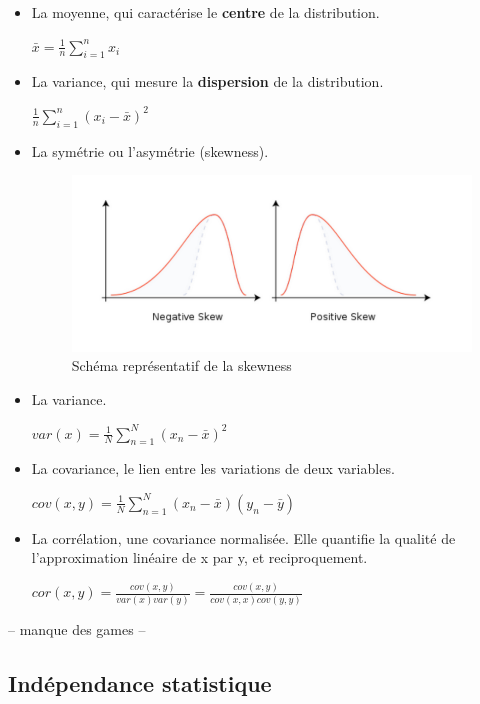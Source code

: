 \documentclass{article}
\begin{document}
\begin{itemize}
\item La moyenne, qui caractérise le \textbf{centre} de la distribution.

$ \bar{x} = \frac{1}{n} \sum_{i=1}^{n} x_i $

\item La variance, qui mesure la \textbf{dispersion} de la distribution.

$ \frac{1}{n} \sum_{i=1}^{n} (x_i - \bar{x})^{2} $

\item La symétrie ou l'asymétrie (skewness).

\begin{figure}[H]
   \caption{Schéma représentatif de la skewness}
    \begin{center} \includegraphics[scale=0.4]{skewness.png} \end{center}
\end{figure}

\item La variance.

$ var(x) = \frac{1}{N} \sum_{n=1}^{N} (x_n - \bar{x})^2 $

\item La covariance, le lien entre les variations de deux variables.

$ cov(x, y) = \frac{1}{N} \sum_{n=1}^{N} (x_n - \bar{x}) (y_n - \bar{y}) $

\item La corrélation, une covariance normalisée. Elle quantifie la qualité de l'approximation linéaire de x par y, et reciproquement.

$ cor(x, y) = \frac{cov(x, y)}{var(x) var(y)} = \frac{cov(x, y)}{cov(x, x) cov(y, y)} $

\end{itemize}

-- manque des games -- 

\subsection{Indépendance statistique}
\end{document}
